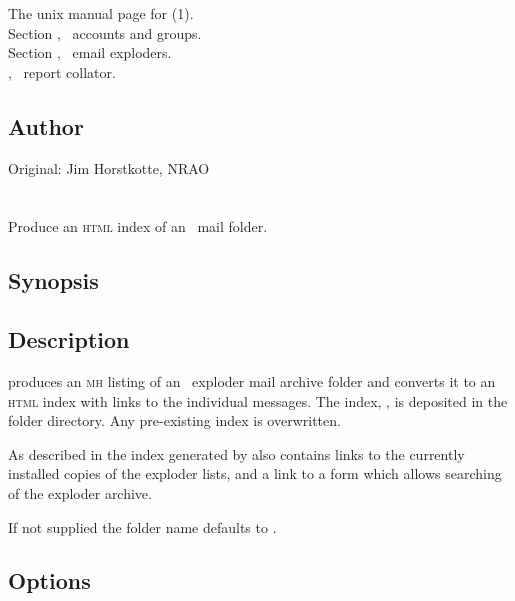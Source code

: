 The unix manual page for (1).\\
Section , \aipspp\ accounts and groups.\\
Section , \aipspp\ email exploders.\\
, \aipspp\ report collator.
 
\subsection*{Author}
 
Original: Jim Horstkotte, NRAO
 

\newpage
\section{}
\label{scanhtml}

Produce an \textsc{html} index of an \aipspp\ mail folder.

\subsection*{Synopsis}

\begin{synopsis}
\end{synopsis}

\subsection*{Description}

 produces an \textsc{mh}  listing of an \aipspp\
exploder mail archive folder and converts it to an \textsc{html} index with
links to the individual messages.  The index, \file{index.html}, is deposited
in the folder directory.  Any pre-existing index is overwritten.

As described in  the index generated by 
also contains links to the currently installed copies of the exploder lists,
and a link to a form which allows searching of the exploder archive.

If not supplied the folder name defaults to .

\subsection*{Options}

